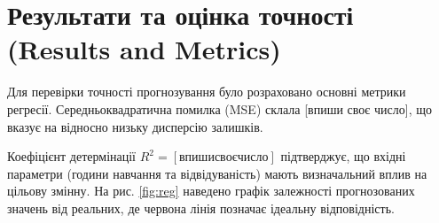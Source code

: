 \documentclass[conference]{IEEEtran}
\begin{document}
\section{Результати та оцінка точності (Results and Metrics)}
Для перевірки точності прогнозування було розраховано основні метрики регресії. 
Середньоквадратична помилка (MSE) склала [впиши своє число], що вказує на відносно низьку дисперсію залишків. 

Коефіцієнт детермінації $R^2 = [впиши своє число]$ підтверджує, що вхідні параметри (години навчання та відвідуваність) мають визначальний вплив на цільову змінну. 
На рис. \ref{fig:reg} наведено графік залежності прогнозованих значень від реальних, де червона лінія позначає ідеальну відповідність.
\end{document}
